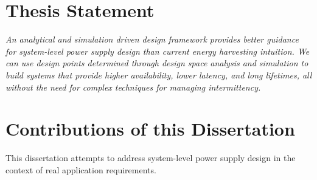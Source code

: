 %
%


\section{Thesis Statement}

\textit{
An analytical and simulation driven design framework provides better guidance for system-level power supply design than current energy harvesting intuition. We can use design points determined through design space analysis and simulation to build systems that provide higher availability, lower latency, and long lifetimes, all without the need for complex techniques for managing intermittency.
}

\section{Contributions of this Dissertation}
This dissertation attempts to address system-level power supply design in the context of real application requirements.

